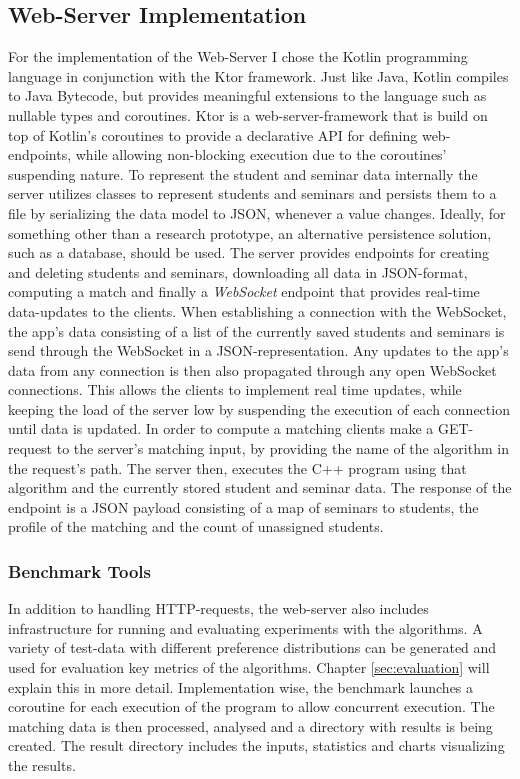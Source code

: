 \subsection{Web-Server Implementation}
For the implementation of the Web-Server I chose the Kotlin programming language in conjunction with the Ktor framework. Just like Java, Kotlin compiles to Java Bytecode, but provides meaningful extensions to the language such as nullable types and coroutines. Ktor is a web-server-framework that is build on top of Kotlin's coroutines to provide a declarative API for defining web-endpoints, while allowing non-blocking execution due to the coroutines' suspending nature. 
To represent the student and seminar data internally the server utilizes classes to represent students and seminars and persists them to a file by serializing the data model to JSON, whenever a value changes. Ideally, for something other than a research prototype, an alternative persistence solution, such as a database, should be used. The server provides endpoints for creating and deleting students and seminars, downloading all data in JSON-format, computing a match and finally a \emph{WebSocket} endpoint that provides real-time data-updates to the clients. When establishing a connection with the WebSocket, the app's data consisting of a list of the currently saved students and seminars is send through the WebSocket in a JSON-representation. Any updates to the app's data from any connection is then also propagated through any open WebSocket connections. This allows the clients to implement real time updates, while keeping the load of the server low by suspending the execution of each connection until data is updated. In order to compute a matching clients make a GET-request to the server's matching input, by providing the name of the algorithm in the request's path. The server then, executes the C++ program using that algorithm and the currently stored student and seminar data. The response of the endpoint is a JSON payload consisting of a map of seminars to students, the profile of the matching and the count of unassigned students.

\subsubsection{Benchmark Tools}
In addition to handling HTTP-requests, the web-server also includes infrastructure for running and evaluating experiments with the algorithms. A variety of test-data with different preference distributions can be generated and used for evaluation key metrics of the algorithms. Chapter \ref{sec:evaluation} will explain this in more detail. Implementation wise, the benchmark launches a coroutine for each execution of the program to allow concurrent execution. The matching data is then processed, analysed and a directory with results is being created. The result directory includes the inputs, statistics and charts visualizing the results.  

